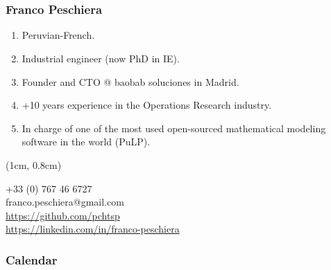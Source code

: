 \section[Context and SoA]{\introtitle}

\begin{frame}
\frametitle{\textbf{Franco Peschiera}}

\begin{enumerate}[<+->]
  \item Peruvian-French.
  \item Industrial engineer (now PhD in IE).
  \item Founder and CTO @ baobab soluciones in Madrid.  
  \item +10 years experience in the Operations Research industry.
  \item In charge of one of the most used open-sourced mathematical modeling software in the world (PuLP).
\end{enumerate}


\begin{textblock*}{\textwidth}(1cm, 0.8cm)
  \begin{flushright}
  {\citesize
  +33 (0) 767 46 6727\\
  franco.peschiera@gmail.com\\
  \url{https://github.com/pchtsp}\\
  \url{https://linkedin.com/in/franco-peschiera}\\
  }
  \end{flushright}
\end{textblock*}
\end{frame}

\begin{frame}
\frametitle{\textbf{Calendar}}

    


\end{frame}


